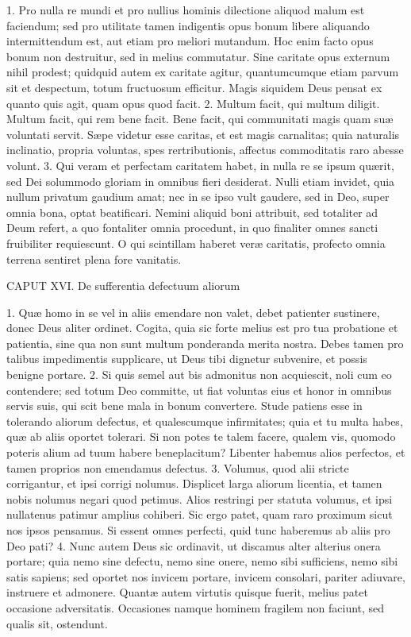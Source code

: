 1. Pro nulla re mundi et pro nullius hominis dilectione aliquod malum est faciendum; sed pro utilitate tamen indigentis opus bonum libere aliquando intermittendum est, aut etiam pro meliori mutandum. Hoc enim facto opus bonum non destruitur, sed in melius commutatur. Sine caritate opus externum nihil prodest; quidquid autem ex caritate agitur, quantumcumque etiam parvum sit et despectum, totum fructuosum efficitur. Magis siquidem Deus pensat ex quanto quis agit, quam opus quod facit.
2. Multum facit, qui multum diligit. Multum facit, qui rem bene facit. Bene facit, qui communitati magis quam suæ voluntati servit. Sæpe videtur esse caritas, et est magis carnalitas; quia naturalis inclinatio, propria voluntas, spes rertributionis, affectus commoditatis raro abesse volunt.
3. Qui veram et perfectam caritatem habet, in nulla re se ipsum quærit, sed Dei solummodo gloriam in omnibus fieri desiderat. Nulli etiam invidet, quia nullum privatum gaudium amat; nec in se ipso vult gaudere, sed in Deo, super omnia bona, optat beatificari. Nemini aliquid boni attribuit, sed totaliter ad Deum refert, a quo fontaliter omnia procedunt, in quo finaliter omnes sancti fruibiliter requiescunt. O qui scintillam haberet veræ caritatis, profecto omnia terrena sentiret plena fore vanitatis.


CAPUT XVI.
De sufferentia defectuum aliorum

1. Quæ homo in se vel in aliis emendare non valet, debet patienter sustinere, donec Deus aliter ordinet. Cogita, quia sic forte melius est pro tua probatione et patientia, sine qua non sunt multum ponderanda merita nostra. Debes tamen pro talibus impedimentis supplicare, ut Deus tibi dignetur subvenire, et possis benigne portare.
2. Si quis semel aut bis admonitus non acquiescit, noli cum eo contendere; sed totum Deo committe, ut fiat voluntas eius et honor in omnibus servis suis, qui scit bene mala in bonum convertere. Stude patiens esse in tolerando aliorum defectus, et qualescumque infirmitates; quia et tu multa habes, quæ ab aliis oportet tolerari. Si non potes te talem facere, qualem vis, quomodo poteris alium ad tuum habere beneplacitum? Libenter habemus alios perfectos, et tamen proprios non emendamus defectus.
3. Volumus, quod alii stricte corrigantur, et ipsi corrigi nolumus. Displicet larga aliorum licentia, et tamen nobis nolumus negari quod petimus. Alios restringi per statuta volumus, et ipsi nullatenus patimur amplius cohiberi. Sic ergo patet, quam raro proximum sicut nos ipsos pensamus. Si essent omnes perfecti, quid tunc haberemus ab aliis pro Deo pati?
4. Nunc autem Deus sic ordinavit, ut discamus alter alterius onera portare; quia nemo sine defectu, nemo sine onere, nemo sibi sufficiens, nemo sibi satis sapiens; sed oportet nos invicem portare, invicem consolari, pariter adiuvare, instruere et admonere. Quantæ autem virtutis quisque fuerit, melius patet occasione adversitatis. Occasiones namque hominem fragilem non faciunt, sed qualis sit, ostendunt.


